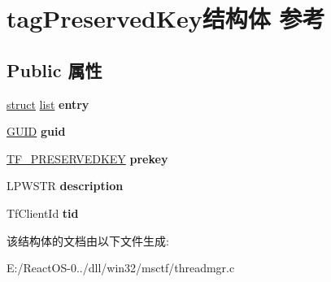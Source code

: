 \hypertarget{structtag_preserved_key}{}\section{tag\+Preserved\+Key结构体 参考}
\label{structtag_preserved_key}
\subsection*{Public 属性}
\begin{DoxyCompactItemize}
\item 
\mbox{\label{structtag_preserved_key_a53644de8a739e55639287558ae694634}} 
\hyperlink{interfacestruct}{struct} \hyperlink{classlist}{list} {\bfseries entry}
\item 
\mbox{\label{structtag_preserved_key_aedcd321f86092737299b2b77ac79c74f}} 
\hyperlink{interface_g_u_i_d}{G\+U\+ID} {\bfseries guid}
\item 
\mbox{\label{structtag_preserved_key_ada6af0b7e125f0cd9d55e5c1dc4cda65}} 
\hyperlink{struct_t_f___p_r_e_s_e_r_v_e_d_k_e_y}{T\+F\+\_\+\+P\+R\+E\+S\+E\+R\+V\+E\+D\+K\+EY} {\bfseries prekey}
\item 
\mbox{\label{structtag_preserved_key_aeef5d32e1413ad8b311d21feee3466e2}} 
L\+P\+W\+S\+TR {\bfseries description}
\item 
\mbox{\label{structtag_preserved_key_afeecce879f6b3e989104747dc2d9a444}} 
Tf\+Client\+Id {\bfseries tid}
\end{DoxyCompactItemize}


该结构体的文档由以下文件生成\+:\begin{DoxyCompactItemize}
\item 
E\+:/\+React\+O\+S-\/0../dll/win32/msctf/threadmgr.\+c\end{DoxyCompactItemize}
